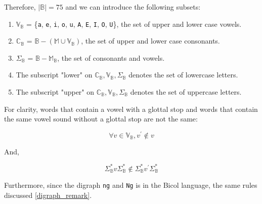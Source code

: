 Therefore, $|\mathbb{B}|=75$ and we can introduce the following subsets:
\begin{enumerate}
    \item \(\mathbb{V}_\mathbb{B}\) = \{\texttt{a}, \texttt{e}, \texttt{i}, \texttt{o}, \texttt{u}, \texttt{A}, \texttt{E}, \texttt{I}, \texttt{O}, \texttt{U}\}, the set of upper and lower case vowels.
    \item \(\mathbb{C}_\mathbb{B}\) = \(\mathbb{B} - (\mathbb{M} \cup \mathbb{V}_\mathbb{B})\),
          the set of upper and lower case consonants.
    \item \(\Sigma_\mathbb{B}\) = \(\mathbb{B} - \mathbb{M}_\mathbb{B}\), the set of consonants and vowels.
    \item The subscript "lower" on \(\mathbb{C}_\mathbb{B}, \mathbb{V}_\mathbb{B}, \Sigma_\mathbb{B}\) denotes the set of lowercase letters.
    \item The subscript "upper" on \(\mathbb{C}_\mathbb{B}, \mathbb{V}_\mathbb{B}, \Sigma_\mathbb{B}\) denotes the set of uppercase letters.
\end{enumerate}

For clarity, words that contain a vowel with a glottal stop and words that contain the same vowel sound without a glottal stop are not the same:

\[
    \forall v\in\mathbb{V}_\mathbb{B}, v^\prime\notin v
\]

And,

\[
    \Sigma_\mathbb{B}^*v\Sigma_\mathbb{B}^*\notin \Sigma_\mathbb{B}^*v^\prime\Sigma_\mathbb{B}^*
\]

Furthermore, since the digraph \texttt{ng} and \texttt{Ng} is in the Bicol language, the same rules discussed \ref{digraph_remark}.